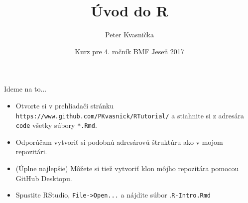 \documentclass[9pt]{beamer}
\author{Peter Kvasnička}
\title{Úvod do R}
\institute{Univerzita Karlova, Praha}
\date{Kurz pre 4. ročník BMF \newline Jeseň 2017}
\begin{document}
\begin{frame}
\titlepage
\end{frame}

\clearpage  \clearpage
\clearpage  \clearpage

\begin{frame}{Ideme na to...}
	\begin{itemize}
		\item Otvorte si v prehliadači stránku \texttt{https://www.github.com/PKvasnick/RTutorial/} a stiahnite si z adresára \texttt{code} všetky súbory \texttt{*.Rmd}.
		\item Odporúčam vytvoriť si podobnú adresárovú štruktúru ako v mojom repozitári.
		\item (Úplne najlepšie) Môžete si tiež vytvoriť klon môjho repozitára pomocou GitHub Desktopu.
		\item Spustite RStudio, \texttt{File->Open...} a nájdite súbor .\texttt{R-Intro.Rmd}
	\end{itemize}
\end{frame}
\end{document}
